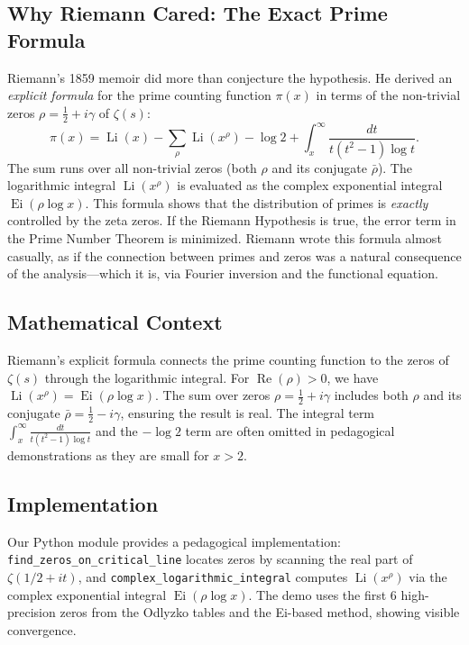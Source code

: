 \documentclass[11pt]{amsart}
\theoremstyle{definition}
\begin{document}
\subsection{Why Riemann Cared: The Exact Prime Formula}
Riemann's 1859 memoir did more than conjecture the hypothesis. He derived an \textit{explicit formula} for the prime counting function $\pi(x)$ in terms of the non-trivial zeros $\rho = \frac{1}{2} + i\gamma$ of $\zeta(s)$:
\[
\pi(x) = \operatorname{Li}(x) - \sum_{\rho} \operatorname{Li}(x^{\rho}) - \log 2 + \int_x^\infty \frac{dt}{t(t^2-1)\log t}.
\]
The sum runs over all non-trivial zeros (both $\rho$ and its conjugate $\bar{\rho}$). The logarithmic integral $\operatorname{Li}(x^{\rho})$ is evaluated as the complex exponential integral $\operatorname{Ei}(\rho \log x)$. This formula shows that the distribution of primes is \textit{exactly} controlled by the zeta zeros. If the Riemann Hypothesis is true, the error term in the Prime Number Theorem is minimized. Riemann wrote this formula almost casually, as if the connection between primes and zeros was a natural consequence of the analysis---which it is, via Fourier inversion and the functional equation.

\subsection{Mathematical Context}
Riemann's explicit formula connects the prime counting function to the zeros of $\zeta(s)$ through the logarithmic integral. For $\operatorname{Re}(\rho) > 0$, we have $\operatorname{Li}(x^{\rho}) = \operatorname{Ei}(\rho \log x)$. The sum over zeros $\rho = \frac{1}{2} + i\gamma$ includes both $\rho$ and its conjugate $\bar{\rho} = \frac{1}{2} - i\gamma$, ensuring the result is real. The integral term $\int_x^\infty \frac{dt}{t(t^2-1)\log t}$ and the $-\log 2$ term are often omitted in pedagogical demonstrations as they are small for $x > 2$.

\subsection{Implementation}
Our Python module provides a pedagogical implementation: \texttt{find\_zeros\_on\_critical\_line} locates zeros by scanning the real part of $\zeta(1/2+it)$, and \texttt{complex\_logarithmic\_integral} computes $\operatorname{Li}(x^\rho)$ via the complex exponential integral $\operatorname{Ei}(\rho \log x)$. The demo uses the first 6 high-precision zeros from the Odlyzko tables and the Ei-based method, showing visible convergence.
\end{document}
